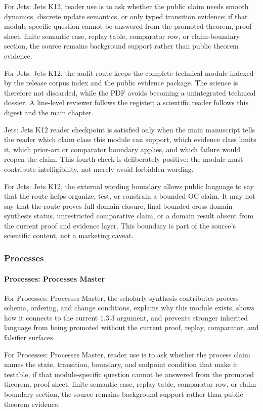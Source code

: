 For Jets: Jets K12, reader use is to ask whether the public claim needs smooth dynamics, discrete update semantics, or only typed transition evidence; if that module-specific question cannot be answered from the promoted theorem, proof sheet, finite semantic case, replay table, comparator row, or claim-boundary section, the source remains background support rather than public theorem evidence.


For Jets: Jets K12, the audit route keeps the complete technical module indexed by the release corpus index and the public evidence package. The science is therefore not discarded, while the PDF avoids becoming a unintegrated technical dossier. A line-level reviewer follows the register; a scientific reader follows this digest and the main chapter.


Jets: Jets K12 reader checkpoint is satisfied only when the main manuscript tells the reader which claim class this module can support, which evidence class limits it, which prior-art or comparator boundary applies, and which failure would reopen the claim. This fourth check is deliberately positive: the module must contribute intelligibility, not merely avoid forbidden wording.


For Jets: Jets K12, the external wording boundary allows public language to say that the route helps organize, test, or constrain a bounded OC claim. It may not say that the route proves full-domain closure, final bounded cross-domain synthesis status, unrestricted comparative claim, or a domain result absent from the current proof and evidence layer. This boundary is part of the source's scientific content, not a marketing caveat.


\subsubsection{Processes}

\paragraph{Processes: Processes Master}

For Processes: Processes Master, the scholarly synthesis contributes process schema, ordering, and change conditions, explains why this module exists, shows how it connects to the current 1.3.3 argument, and prevents stronger inherited language from being promoted without the current proof, replay, comparator, and falsifier surfaces.


For Processes: Processes Master, reader use is to ask whether the process claim names the state, transition, boundary, and endpoint condition that make it testable; if that module-specific question cannot be answered from the promoted theorem, proof sheet, finite semantic case, replay table, comparator row, or claim-boundary section, the source remains background support rather than public theorem evidence.


